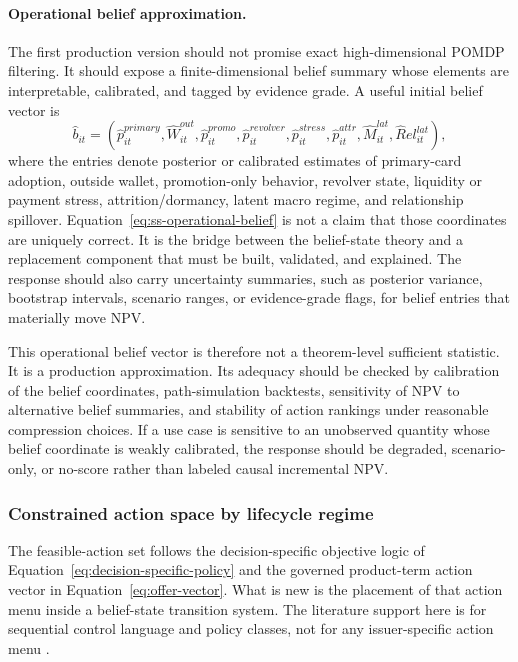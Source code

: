 \documentclass[11pt]{article}
\newcommand{\1}{\mathbf{1}}
\begin{document}
\paragraph{Operational belief approximation.}
The first production version should not promise exact high-dimensional POMDP
filtering. It should expose a finite-dimensional belief summary whose elements
are interpretable, calibrated, and tagged by evidence grade. A useful initial
belief vector is
\begin{equation}
  \widehat b_{it}
  =
  (\widehat p^{primary}_{it},\widehat W^{out}_{it},
   \widehat p^{promo}_{it},\widehat p^{revolver}_{it},
   \widehat p^{stress}_{it},\widehat p^{attr}_{it},
   \widehat M^{lat}_{it},\widehat Rel^{lat}_{it}),
  \label{eq:ss-operational-belief}
\end{equation}
where the entries denote posterior or calibrated estimates of primary-card
adoption, outside wallet, promotion-only behavior, revolver state, liquidity or
payment stress, attrition/dormancy, latent macro regime, and relationship
spillover. Equation~\eqref{eq:ss-operational-belief} is not a claim that those
coordinates are uniquely correct. It is the bridge between the belief-state
theory and a replacement component that must be built, validated, and explained.
The response should also carry uncertainty summaries, such as posterior
variance, bootstrap intervals, scenario ranges, or evidence-grade flags, for
belief entries that materially move NPV.

This operational belief vector is therefore not a theorem-level sufficient
statistic. It is a production approximation. Its adequacy should be checked by
calibration of the belief coordinates, path-simulation backtests, sensitivity of
NPV to alternative belief summaries, and stability of action rankings under
reasonable compression choices. If a use case is sensitive to an unobserved
quantity whose belief coordinate is weakly calibrated, the response should be
degraded, scenario-only, or no-score rather than labeled causal incremental NPV.

\subsubsection{Constrained action space by lifecycle regime}
\label{subsec:state-space-action-space}

The feasible-action set follows the decision-specific objective logic of
Equation~\eqref{eq:decision-specific-policy} and the governed product-term
action vector in Equation~\eqref{eq:offer-vector}. What is new is the placement
of that action menu inside a belief-state transition system. The literature
support here is for sequential control language and policy classes, not for
any issuer-specific action menu
\citep{puterman1994mdp,murphy2003dynamic,trench2003bankone}.
\end{document}
